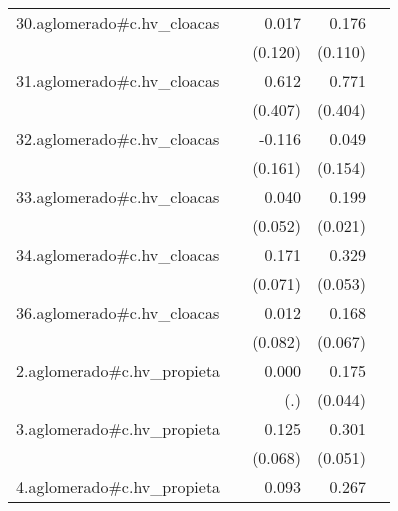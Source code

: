 {\begin{longtable}{l*{4}{D{.}{.}{-1}}}
\addlinespace
30.aglomerado#c.hv\_cloacas&                     &       0.017         &       0.176         &                     \\
            &                     &     (0.120)         &     (0.110)         &                     \\
\addlinespace
31.aglomerado#c.hv\_cloacas&                     &       0.612         &       0.771         &                     \\
            &                     &     (0.407)         &     (0.404)         &                     \\
\addlinespace
32.aglomerado#c.hv\_cloacas&                     &      -0.116         &       0.049         &                     \\
            &                     &     (0.161)         &     (0.154)         &                     \\
\addlinespace
33.aglomerado#c.hv\_cloacas&                     &       0.040         &       0.199\sym{***}&                     \\
            &                     &     (0.052)         &     (0.021)         &                     \\
\addlinespace
34.aglomerado#c.hv\_cloacas&                     &       0.171\sym{*}  &       0.329\sym{***}&                     \\
            &                     &     (0.071)         &     (0.053)         &                     \\
\addlinespace
36.aglomerado#c.hv\_cloacas&                     &       0.012         &       0.168\sym{*}  &                     \\
            &                     &     (0.082)         &     (0.067)         &                     \\
\addlinespace
2.aglomerado#c.hv\_propieta&                     &       0.000         &       0.175\sym{***}&                     \\
            &                     &         (.)         &     (0.044)         &                     \\
\addlinespace
3.aglomerado#c.hv\_propieta&                     &       0.125         &       0.301\sym{***}&                     \\
            &                     &     (0.068)         &     (0.051)         &                     \\
\addlinespace
4.aglomerado#c.hv\_propieta&                     &       0.093         &       0.267\sym{***}&                     \\

\end{longtable}}
